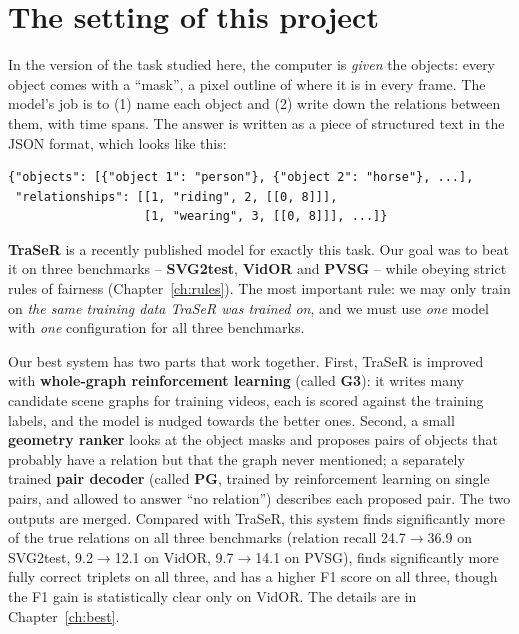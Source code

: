 \documentclass[11pt,openany]{book}
\begin{document}
\section*{The setting of this project}
In the version of the task studied here, the computer is \emph{given} the objects: every object comes with a ``mask'', a pixel
outline of where it is in every frame. The model's job is to (1) name each object and (2) write down the relations between them,
with time spans. The answer is written as a piece of structured text in the JSON format, which looks like this:
\begin{verbatim}
{"objects": [{"object 1": "person"}, {"object 2": "horse"}, ...],
 "relationships": [[1, "riding", 2, [[0, 8]]],
                   [1, "wearing", 3, [[0, 8]]], ...]}
\end{verbatim}

\textbf{TraSeR} is a recently published model for exactly this task. Our goal was to beat it on three benchmarks --
\textbf{SVG2test}, \textbf{VidOR} and \textbf{PVSG} -- while obeying strict rules of fairness (Chapter~\ref{ch:rules}). The most
important rule: we may only train on \emph{the same training data TraSeR was trained on}, and we must use \emph{one} model with
\emph{one} configuration for all three benchmarks.

\begin{bestbox}
Our best system has two parts that work together. First, TraSeR is improved with \textbf{whole-graph reinforcement learning}
(called \textbf{G3}): it writes many candidate scene graphs for training videos, each is scored against the training labels, and
the model is nudged towards the better ones. Second, a small \textbf{geometry ranker} looks at the object masks and proposes pairs
of objects that probably have a relation but that the graph never mentioned; a separately trained \textbf{pair decoder}
(called \textbf{PG}, trained by reinforcement learning on single pairs, and allowed to answer ``no relation'') describes each
proposed pair. The two outputs are merged. Compared with TraSeR, this system finds significantly more of the true relations on all
three benchmarks (relation recall 24.7$\to$36.9 on SVG2test, 9.2$\to$12.1 on VidOR, 9.7$\to$14.1 on PVSG), finds significantly
more fully correct triplets on all three, and has a higher F1 score on all three, though the F1 gain is statistically clear only
on VidOR. The details are in Chapter~\ref{ch:best}.
\end{bestbox}
\end{document}
